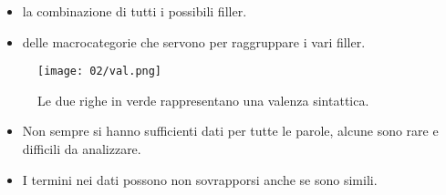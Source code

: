 \begin{itemize}
  \item {} la combinazione di tutti i possibili filler. 
  \item {} delle macrocategorie che servono per raggruppare i vari filler.
\end{itemize}

\begin{figure}[h]
    \centering
    \texttt{[image: 02/val.png]}
    \caption{Le due righe in verde rappresentano una valenza sintattica.}
    \label{fig:val2}
\end{figure}


\begin{itemize}
  \item Non sempre si hanno sufficienti dati per tutte le parole, alcune sono rare e difficili da analizzare. 
  \item I termini nei dati possono non sovrapporsi anche se sono simili. 
\end{itemize}






